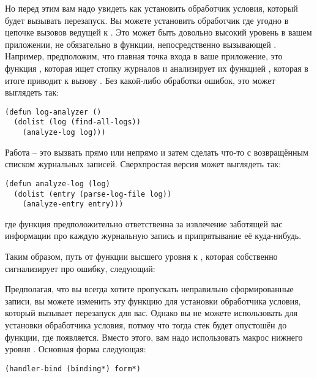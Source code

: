 Но перед этим вам надо увидеть как установить обработчик условия, который будет вызывать
 перезапуск. Вы можете установить обработчик где угодно в цепочке
вызовов ведущей к . Это может быть довольно высокий уровень в вашем
приложении, не обязательно в функции, непосредственно вызывающей
. Например, предположим, что главная точка входа в ваше приложение,
это функция , которая ищет стопку журналов и анализирует их функцией
, которая в итоге приводит к вызову . Без
какой-либо обработки ошибок, это может выглядеть так:

\begin{lstlisting}
(defun log-analyzer ()
  (dolist (log (find-all-logs))
    (analyze-log log)))
\end{lstlisting}

Работа  -- это вызвать прямо или непрямо  и затем
сделать что-то с возвращённым списком журнальных записей. Сверхпростая версия может
выглядеть так:

\begin{lstlisting}
(defun analyze-log (log)
  (dolist (entry (parse-log-file log))
    (analyze-entry entry)))
\end{lstlisting}

где функция  предположительно ответственна за извлечение заботящей вас
информации про каждую журнальную запись и припрятывание её куда-нибудь.

Таким образом, путь от функции высшего уровня  к
, которая собственно сигнализирует про ошибку, следующий:


Предполагая, что вы всегда хотите пропускать неправильно сформированные записи, вы можете
изменить эту функцию для установки обработчика условия, который вызывает перезапуск
 для вас. Однако вы не можете использовать  для
установки обработчика условия, потмоу что тогда стек будет опустошён до функции, где
 появляется. Вместо этого, вам надо использовать макрос нижнего уровня
. Основная форма  следующая:

\begin{lstlisting}
(handler-bind (binding*) form*)
\end{lstlisting}

